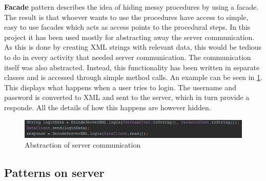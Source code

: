 \textbf{Facade} pattern describes the idea of hiding messy procedures by using a facade. The result is that whoever wants to use the procedures have access to simple, easy to use facades which acts as access points to the procedural steps. In this project it has been used mostly for abstracting away the server communication. As this is done by creating XML strings with relevant data, this would be tedious to do in every activity that needed server communication. The communication itself was also abstracted. Instead, this functionality has been written in separate classes and is accessed through simple method calls. An example can be seen in \ref{fig:facadepattern}. This displays what happens when a user tries to login. The username and password is converted to XML and sent to the server, which in turn provide a responde. All the details of how this happens are however hidden.

\begin{figure}[H]
\centering
\includegraphics[width=\textwidth]{billeder/facadepattern.png}
\caption{Abstraction of server communication}
\label{fig:facadepattern}
\end{figure} 

\subsection{Patterns on server}

